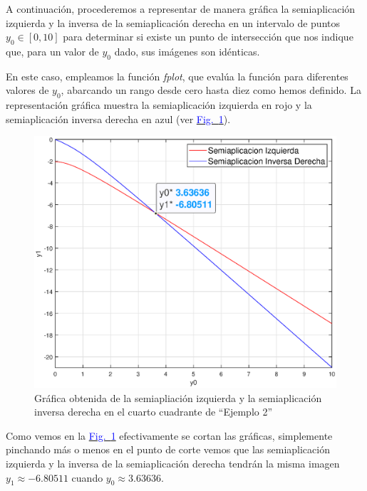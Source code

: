 \documentclass[12pt,a4paper]{report} %
\newcommand{\fref}[1]{\hyperref[#1]{\textcolor{blue}{Fig.~\ref*{#1}}}}
\newcommand{\fref}[1]{\hyperref[#1]{\textcolor{blue}{\textit{Fig.~\ref*{#1}}}}}
\begin{document}
 	A continuación, procederemos a representar de manera gráfica la semiaplicación izquierda y la inversa de la semiaplicación derecha en un intervalo de puntos $y_0 \in [0, 10]$ para determinar si existe un punto de intersección que nos indique que, para un valor de $y_0$ dado, sus imágenes son idénticas.
	
	\vspace{1cm}
	
	\vspace{1cm}En este caso, empleamos la función \textit{fplot}, que evalúa la función para diferentes valores de $y_0$, abarcando un rango desde cero hasta diez como hemos definido. La representación gráfica muestra la semiaplicación izquierda en rojo y la semiaplicación inversa derecha en azul (ver \fref{fig:ejem2_2}).
	\newpage
	
	\begin{figure}[h]
		\centering
		\includegraphics[width=1\textwidth]{g1ejem2.eps}
		\caption{Gráfica obtenida de la semiapliación izquierda y la semiaplicación inversa derecha en el cuarto cuadrante de ``Ejemplo 2''}
		\label{fig:ejem2_2}
	\end{figure}\smallskip
	
	Como vemos en la \fref{fig:ejem2_2} efectivamente se cortan las gráficas, simplemente pinchando más o menos en el punto de corte vemos que las semiaplicación izquierda y la inversa de la semiaplicación derecha tendrán la misma imagen $y_1\approx-6.80511$ cuando $y_0\approx3.63636$.
	\newpage
	
\end{document}
